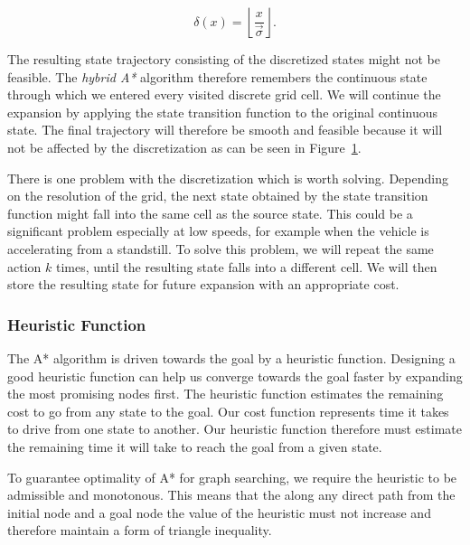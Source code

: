 \[
	\delta(x) = \left\lfloor \dfrac{x}{\vec{\sigma}} \right\rfloor.
\]

The resulting state trajectory consisting of the discretized states might not be feasible. The \textit{hybrid A*} algorithm therefore remembers the continuous state through which we entered every visited discrete grid cell. We will continue the expansion by applying the state transition function to the original continuous state. The final trajectory will therefore be smooth and feasible because it will not be affected by the discretization as can be seen in Figure~\ref{fig:hybrid_astar_discretized_vs_continuous}.

\begin{figure}
	\centering
	\caption{}
	\label{fig:hybrid_astar_discretized_vs_continuous}
\end{figure}

There is one problem with the discretization which is worth solving. Depending on the resolution of the grid, the next state obtained by the state transition function might fall into the same cell as the source state. This could be a significant problem especially at low speeds, for example when the vehicle is accelerating from a standstill. To solve this problem, we will repeat the same action $k$ times, until the resulting state falls into a different cell. We will then store the resulting state for future expansion with an appropriate cost.

\subsubsection{Heuristic Function}

The A* algorithm is driven towards the goal by a heuristic function. Designing a good heuristic function can help us converge towards the goal faster by expanding the most promising nodes first. The heuristic function estimates the remaining cost to go from any state to the goal. Our cost function represents time it takes to drive from one state to another. Our heuristic function therefore must estimate the remaining time it will take to reach the goal from a given state.

To guarantee optimality of A* for graph searching, we require the heuristic to be admissible and monotonous. This means that the along any direct path from the initial node and a goal node the value of the heuristic must not increase and therefore maintain a form of triangle inequality.

